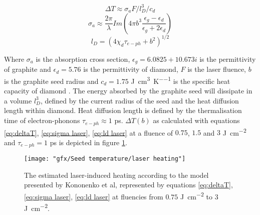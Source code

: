 \begin{equation}
\Delta T \approx\sigma_{a}F/l_{D}^{3}/c_{d}
\label{eq:deltaT}
\end{equation}
\begin{equation}
\sigma_{a} \approx \frac{2\pi}{\lambda}Im\left(4\pi b^{3}\frac{\epsilon_{g}-\epsilon_{d}}{\epsilon_{g}+2\epsilon_{d}}\right)
\label{eq:sigma laser}
\end{equation}
\begin{equation}
l_{D} = \left(4\chi_{d}\tau_{e-ph}+b^{2}\right)^{1/2}
\label{eq:ld laser}
\end{equation}

Where $\sigma_{a}$ is the absorption cross section, $\epsilon_{g}=6.0825+10.673i$ \cite{djurisic:1999} is the permittivity of graphite and $\epsilon_{d}=5.76$ \cite{phillip:1964} is the permittivity of diamond, $F$ is the laser fluence, $b$ is the graphite seed radius and $c_{d}=1.75$ \si{\joule\per\centi\metre\cubed\per\kelvin} is the specific heat capacity of diamond \cite{prelas:1997}. The energy absorbed by the graphite seed will dissipate in a volume $l_{D}^{3}$, defined by the current radius of the seed and the heat diffusion length within diamond. Heat diffusion length is defined by the thermalisation time of electron-phonons  $\tau_{e-ph}\approx1$ \si{\pico\second}. $\Delta T\left(b\right)$ as calculated with equations \ref{eq:deltaT}, \ref{eq:sigma laser}, \ref{eq:ld laser} at a fluence of $0.75$, $1.5$ and $3$ \si{\joule\per\centi\metre\squared} and $\tau_{e-ph}=1$ \si{\pico\second} is depicted in figure \ref{fig:laser-heating}.

\begin{figure}
	\centering
	\texttt{[image: "gfx/Seed temperature/laser heating"]}
	\caption{The estimated laser-induced heating according to the model presented by Kononenko et al, represented by equations \ref{eq:deltaT}, \ref{eq:sigma laser}, \ref{eq:ld laser} at fluencies from $0.75$ \si{\joule\per\centi\metre\squared} to $3$ \si{\joule\per\centi\metre\squared}.}
	\label{fig:laser-heating}
\end{figure}

